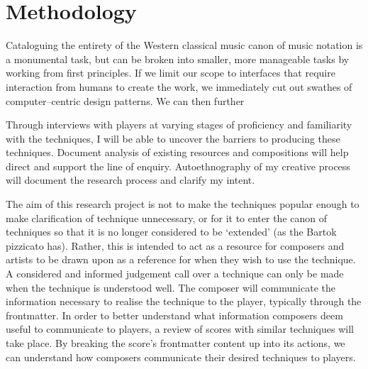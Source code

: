 \section{Methodology}

Cataloguing the entirety of the Western classical music canon of music notation is a monumental task, but can be broken into smaller, more manageable tasks by working from first principles.
If we limit our scope to interfaces that require interaction from humans to create the work, we immediately cut out swathes of computer--centric design patterns.
We can then further 

Through interviews with players at varying stages of proficiency and familiarity with the techniques, I will be able to uncover the barriers to producing these techniques. 
Document analysis of existing resources and compositions will help direct and support the line of enquiry. 
Autoethnography of my creative process will document the research process and clarify my intent.  

The aim of this research project is not to make the techniques popular enough to make clarification of technique unnecessary, or for it to enter the canon of techniques so that it is no longer considered to be `extended' (as the Bartok pizzicato has).
Rather, this is intended to act as a resource for composers and artists to be drawn upon as a reference for when they wish to use the technique.
A considered and informed judgement call over a technique can only be made when the technique is understood well.
The composer will communicate the information necessary to realise the technique to the player, typically through the frontmatter. 
In order to better understand what information composers deem useful to communicate to players, a review of scores with similar techniques will take place.
By breaking the score's frontmatter content up into its actions, we can understand how composers communicate their desired techniques to players.